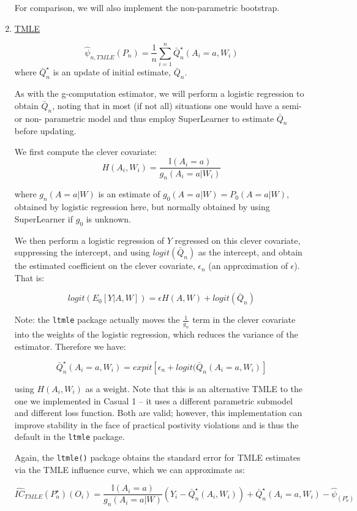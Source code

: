 \documentclass[answers]{exam}
\begin{document}
\begin{enumerate}
For comparison, we will also implement the non-parametric bootstrap.

\item \underline{TMLE}

\[
\hat{\psi}_{n, TMLE}(P_{n})=\frac{1}{n}\sum_{i=1}^{n}\bar{Q}_{n}^{\star}(A_i=a,W_{i})
\]
 where $\bar{Q}_{n}^{\star}$ is an update of initial estimate, $\bar{Q}_{n}$. 
 
As with the g-computation estimator, we will perform a logistic regression to obtain $\bar{Q}_{n}$, noting that in most (if not all) situations one would have a semi- or non- parametric model and thus employ SuperLearner to estimate $\bar{Q}_{n}$ before updating.

We first compute the clever covariate:
\[
H(A_{i},W_{i})=\frac{\mathbb{I}(A_{i}=a)}{g_{n}(A_{i}=a\vert W_{i})}
\]

where $g_{n}(A=a\vert W)$ is an estimate of $g_{0}(A=a\vert W)=P_{0}(A=a\vert W)$, obtained by logistic regression here, but normally obtained by using SuperLearner if $g_{0}$ is unknown.

We then perform a logistic regression of $Y$ regressed on this clever covariate, suppressing the intercept, and using $logit(\bar{Q}_{n})$ as the intercept, and obtain the estimated coefficient on the clever covariate,  $\epsilon_{n}$ (an approximation of $\epsilon$). That is:

\[
logit\left(E_{0}[Y\vert A,W]\right)=\epsilon H(A,W)+logit(\bar{Q}_{n})
\]
 
Note: the \texttt{ltmle} package actually moves the $\frac{1}{g_n}$ term in the clever covariate into the weights of the logistic regression, which reduces the variance of the estimator. Therefore we have:

\[
\bar{Q}_{n}^{\star}(A_{i}=a,W_{i})=expit[\epsilon_{n} + logit(\bar{Q}_{n}(A_{i}=a,W_{i})]
\]

using $H(A_i,W_i)$ as a weight. Note that this is an alternative TMLE to the one we implemented in Casual 1 -- it uses a different parametric submodel and different loss function. Both are valid; however, this implementation can improve stability in the face of practical postivity violations and is thus the default in the \texttt{ltmle} package.

Again, the \texttt{ltmle()} package obtains the standard error for TMLE estimates via the TMLE influence curve, which we can approximate as:

\[
\hat{IC}_{TMLE}(P_{n}^{\star})(O_i)=\frac{\mathbb{I}(A_i=a)}{g_{n}(A_i=a\vert W)}(Y_i-\bar{Q}_{n}^{\star}(A_i,W_i))+\bar{Q}_{n}^{\star}(A_i=a,W_i)-\hat{\psi}_{(P_{n}^{\star})}
\]\\



\end{enumerate}
\end{document}
